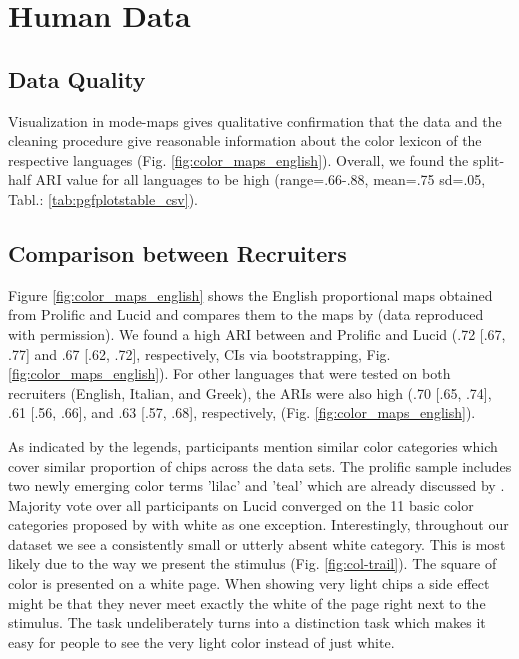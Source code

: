 \section{Human Data}
\subsection{Data Quality}

Visualization in mode-maps gives qualitative confirmation that the data and the cleaning procedure give reasonable information about the color lexicon of the respective languages (Fig. \ref{fig:color_maps_english}).
Overall, we found the split-half ARI value for all languages to be high (range=.66-.88, mean=.75 sd=.05, Tabl.: \ref{tab:pgfplotstable_csv}).


\subsection{Comparison between Recruiters}

 Figure \ref{fig:color_maps_english} shows the English proportional maps obtained from Prolific and Lucid and compares them to the maps by \textcite{lindseyColor2014} (data reproduced with permission). 
We found a high ARI between \textcite{lindseyColor2014} and Prolific and Lucid (.72 [.67, .77] and .67 [.62, .72], respectively, CIs via bootstrapping, Fig. \ref{fig:color_maps_english}). 
For other languages that were tested on both recruiters (English, Italian, and Greek), the ARIs were also high (.70 [.65, .74], .61 [.56, .66], and .63 [.57, .68], respectively, (Fig. \ref{fig:color_maps_english}). 

 As indicated by the legends, participants mention similar color categories which cover similar proportion of chips across the data sets.
 The prolific sample includes two newly emerging color terms 'lilac' and 'teal' which are already discussed by \textcite{lindseyColor2014}.
 Majority vote over all participants on Lucid converged on the 11 basic color categories proposed by \textcite{berlinBasic1969} with white as one exception.
 Interestingly, throughout our dataset we see a consistently small or utterly absent white category. This is most likely due to the way we present the stimulus (Fig. \ref{fig:col-trail}). The square of color is presented on a white page. When showing very light chips a side effect might be that they never meet exactly the white of the page right next to the stimulus. The task undeliberately turns into a distinction task which makes it easy for people to see the very light color instead of just white.

